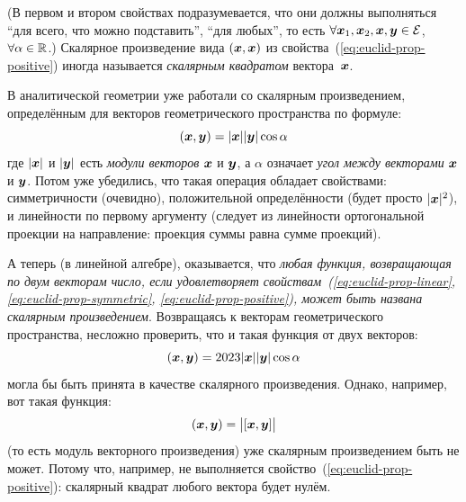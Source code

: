 \documentclass[a4paper,12pt]{article}
\begin{document}
  (В первом и втором свойствах подразумевается, что они должны выполняться ``для всего, что можно подставить'', ``для любых'', то есть $\forall \bds x_1, \bds x_2, \bds x, \bds y \hm\in \mathcal E$, $\forall \alpha \hm\in \RR$.)
  Скалярное произведение вида $(\boldsymbol x, \boldsymbol x)$ из свойства~(\ref{eq:euclid-prop-positive}) иногда называется \emph{скалярным квадратом} вектора~$\boldsymbol x$.
  
  \begin{example}
    В аналитической геометрии уже работали со скалярным произведением, определённым для векторов геометрического пространства по формуле:
    \[
      (\boldsymbol x, \boldsymbol y) = |\boldsymbol x| |\boldsymbol y| \cos \alpha
    \]
    где $|\boldsymbol x|$ и $|\boldsymbol y|$ есть \emph{модули векторов} $\boldsymbol x$ и $\boldsymbol y$, а $\alpha$ означает \emph{угол между векторами} $\boldsymbol x$ и $\boldsymbol y$.
    Потом уже убедились, что такая операция обладает свойствами: симметричности (очевидно), положительной определённости (будет просто $|\boldsymbol x|^2$), и линейности по первому аргументу (следует из линейности ортогональной проекции на направление: проекция суммы равна сумме проекций).
    
    А теперь (в линейной алгебре), оказывается, что \emph{любая функция, возвращающая по двум векторам число, если удовлетворяет свойствам~(\ref{eq:euclid-prop-linear}, \ref{eq:euclid-prop-symmetric}, \ref{eq:euclid-prop-positive}), может быть названа скалярным произведением}.
    Возвращаясь к векторам геометрического пространства, несложно проверить, что и такая функция от двух векторов:
    \[
      (\boldsymbol x, \boldsymbol y) = 2023 |\boldsymbol x| |\boldsymbol y| \cos\alpha
    \]
    могла бы быть принята в качестве скалярного произведения.
    Однако, например, вот такая функция:
    \[
      (\boldsymbol x, \boldsymbol y) = \bigl|[\boldsymbol x, \boldsymbol y]\bigr|
    \]
    (то есть модуль векторного произведения) уже скалярным произведением быть не может.
    Потому что, например, не выполняется свойство~(\ref{eq:euclid-prop-positive}): скалярный квадрат любого вектора будет нулём.
  \end{example}
  
\end{document}
